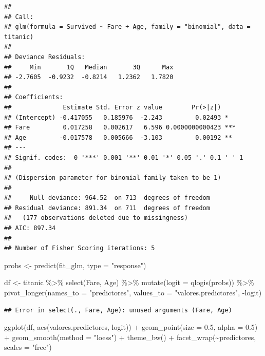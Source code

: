 \documentclass[
  12pt,
]{book}
\newenvironment{Shaded}{\begin{snugshade}}{\end{snugshade}}
\newcommand{\AttributeTok}[1]{\textcolor[rgb]{0.77,0.63,0.00}{#1}}
\newcommand{\FloatTok}[1]{\textcolor[rgb]{0.00,0.00,0.81}{#1}}
\newcommand{\FunctionTok}[1]{\textcolor[rgb]{0.00,0.00,0.00}{#1}}
\newcommand{\NormalTok}[1]{#1}
\newcommand{\OtherTok}[1]{\textcolor[rgb]{0.56,0.35,0.01}{#1}}
\newcommand{\SpecialCharTok}[1]{\textcolor[rgb]{0.00,0.00,0.00}{#1}}
\newcommand{\StringTok}[1]{\textcolor[rgb]{0.31,0.60,0.02}{#1}}
\theoremstyle{definition}
\theoremstyle{definition}
\theoremstyle{definition}
\theoremstyle{definition}
\theoremstyle{remark}
\begin{document}
\begin{verbatim}
## 
## Call:
## glm(formula = Survived ~ Fare + Age, family = "binomial", data = titanic)
## 
## Deviance Residuals: 
##     Min       1Q   Median       3Q      Max  
## -2.7605  -0.9232  -0.8214   1.2362   1.7820  
## 
## Coefficients:
##              Estimate Std. Error z value        Pr(>|z|)    
## (Intercept) -0.417055   0.185976  -2.243         0.02493 *  
## Fare         0.017258   0.002617   6.596 0.0000000000423 ***
## Age         -0.017578   0.005666  -3.103         0.00192 ** 
## ---
## Signif. codes:  0 '***' 0.001 '**' 0.01 '*' 0.05 '.' 0.1 ' ' 1
## 
## (Dispersion parameter for binomial family taken to be 1)
## 
##     Null deviance: 964.52  on 713  degrees of freedom
## Residual deviance: 891.34  on 711  degrees of freedom
##   (177 observations deleted due to missingness)
## AIC: 897.34
## 
## Number of Fisher Scoring iterations: 5
\end{verbatim}

\begin{Shaded}
\begin{Highlighting}[]
\NormalTok{probs }\OtherTok{\textless{}{-}} \FunctionTok{predict}\NormalTok{(fit\_glm, }\AttributeTok{type =} \StringTok{"response"}\NormalTok{)}

\NormalTok{df }\OtherTok{\textless{}{-}}\NormalTok{ titanic }\SpecialCharTok{\%\textgreater{}\%}
    \FunctionTok{select}\NormalTok{(Fare, Age) }\SpecialCharTok{\%\textgreater{}\%}
    \FunctionTok{mutate}\NormalTok{(}\AttributeTok{logit =} \FunctionTok{qlogis}\NormalTok{(probs)) }\SpecialCharTok{\%\textgreater{}\%}
    \FunctionTok{pivot\_longer}\NormalTok{(}\AttributeTok{names\_to =} \StringTok{"predictores"}\NormalTok{, }\AttributeTok{values\_to =} \StringTok{"valores.predictores"}\NormalTok{,}
        \SpecialCharTok{{-}}\NormalTok{logit)}
\end{Highlighting}
\end{Shaded}

\begin{verbatim}
## Error in select(., Fare, Age): unused arguments (Fare, Age)
\end{verbatim}

\begin{Shaded}
\begin{Highlighting}[]
\FunctionTok{ggplot}\NormalTok{(df, }\FunctionTok{aes}\NormalTok{(valores.predictores, logit)) }\SpecialCharTok{+} \FunctionTok{geom\_point}\NormalTok{(}\AttributeTok{size =} \FloatTok{0.5}\NormalTok{,}
    \AttributeTok{alpha =} \FloatTok{0.5}\NormalTok{) }\SpecialCharTok{+} \FunctionTok{geom\_smooth}\NormalTok{(}\AttributeTok{method =} \StringTok{"loess"}\NormalTok{) }\SpecialCharTok{+}
    \FunctionTok{theme\_bw}\NormalTok{() }\SpecialCharTok{+} \FunctionTok{facet\_wrap}\NormalTok{(}\SpecialCharTok{\textasciitilde{}}\NormalTok{predictores, }\AttributeTok{scales =} \StringTok{"free"}\NormalTok{)}
\end{Highlighting}
\end{Shaded}
\end{document}
